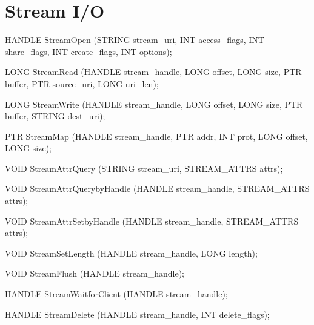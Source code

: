 \section{Stream I/O}
\label{sec:abi:streams}



\begin{paldef}
HANDLE StreamOpen (STRING stream_uri,
                   INT access_flags, INT share_flags,
                   INT create_flags, INT options);
\end{paldef}




\begin{paldef}
LONG StreamRead (HANDLE stream_handle,
                 LONG offset, LONG size, PTR buffer,
                 PTR source_uri, LONG uri_len);
\end{paldef}




\begin{paldef}
LONG StreamWrite (HANDLE stream_handle,
                  LONG offset, LONG size, PTR buffer,
                  STRING dest_uri);
\end{paldef}



\begin{paldef}
PTR StreamMap (HANDLE stream_handle, PTR addr,
               INT prot, LONG offset, LONG size);
\end{paldef}


\begin{paldef}
VOID StreamAttrQuery (STRING stream_uri,
                      STREAM_ATTRS attrs);
\end{paldef}


\begin{paldef}
VOID StreamAttrQuerybyHandle (HANDLE stream_handle,
                              STREAM_ATTRS attrs);
\end{paldef}



\begin{paldef}
VOID StreamAttrSetbyHandle (HANDLE stream_handle,
                            STREAM_ATTRS attrs);
\end{paldef}



\begin{paldef}
VOID StreamSetLength (HANDLE stream_handle,
                      LONG length);
\end{paldef}



\begin{paldef}
VOID StreamFlush (HANDLE stream_handle);
\end{paldef}


\begin{paldef}
HANDLE StreamWaitforClient (HANDLE stream_handle);
\end{paldef}



\begin{paldef}
HANDLE StreamDelete (HANDLE stream_handle,
                     INT delete_flags);
\end{paldef}
